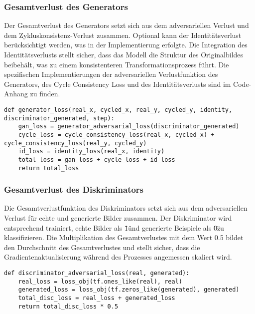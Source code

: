 \subsubsection{Gesamtverlust des Generators}
Der Gesamtverlust des Generators setzt sich aus dem adversariellen Verlust und dem Zykluskonsistenz-Verlust zusammen. Optional kann der Identitätsverlust berücksichtigt werden, was in der Implementierung erfolgte. Die Integration des Identitätsverlusts stellt sicher, dass das Modell die Struktur des Originalbildes beibehält, was zu einem konsistenteren Transformationsprozess führt. Die spezifischen Implementierungen der adversariellen Verlustfunktion des Generators, des Cycle Consistency Loss und des Identitätsverlusts sind im Code-Anhang zu finden.
\begin{lstlisting}[language=pyhaff, caption={Vorverarbeitung des Datensatzes: Jittering}, label={cod:cycleGanGeneratorVerlust}]
def generator_loss(real_x, cycled_x, real_y, cycled_y, identity, discriminator_generated, step):
    gan_loss = generator_adversarial_loss(discriminator_generated)
    cycle_loss = cycle_consistency_loss(real_x, cycled_x) + cycle_consistency_loss(real_y, cycled_y)
    id_loss = identity_loss(real_x, identity)
    total_loss = gan_loss + cycle_loss + id_loss
    return total_loss
\end{lstlisting}

\subsubsection{Gesamtverlust des Diskriminators}
Die Gesamtverlustfunktion des Diskriminators setzt sich aus dem adversariellen Verlust für echte und generierte Bilder zusammen. Der Diskriminator wird entsprechend trainiert, echte Bilder als \"1\" und generierte Beispiele als \"0\" zu klassifizieren. Die Multiplikation des Gesamtverlustes mit dem Wert 0.5 bildet den Durchschnitt des Gesamtverlustes und stellt sicher, dass die Gradientenaktualisierung während des Prozesses angemessen skaliert wird.

\begin{lstlisting}[language=pyhaff, caption={Vorverarbeitung des Datensatzes: Jittering}, label={cod:cycleGanDiscriminatorVerlust}]
def discriminator_adversarial_loss(real, generated):
    real_loss = loss_obj(tf.ones_like(real), real)
    generated_loss = loss_obj(tf.zeros_like(generated), generated)
    total_disc_loss = real_loss + generated_loss
    return total_disc_loss * 0.5
\end{lstlisting}




